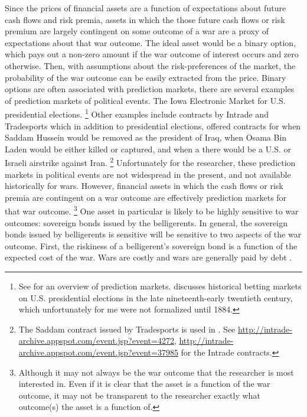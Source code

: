Since the prices of financial assets are a function of expectations about future cash flows and risk premia, assets in which the those future cash flows or risk premium are largely contingent on some outcome of a war are a proxy of expectations about that war outcome.
The ideal asset would be a binary option, which pays out a non-zero amount if the war outcome of interest occurs and zero otherwise.
Then, with assumptions about the risk-preferences of the market, the probability of the war outcome can be easily extracted from the price.
Binary options are often associated with prediction markets, there are several examples of prediction markets of political events. 
The Iowa Electronic Market for U.S. presidential elections.%
\footnote{
  See \textcite{WolfersZitzewitz2004} for an overview of prediction markets.
  \textcite{RhodeStrumpf2004a} discusses historical betting markets on U.S. presidential elections in the late nineteenth-early twentieth century, which unfortunately for me were not formalized until 1884.
}
Other examples include contracts by Intrade and Tradesports which in addition to presidential elections, offered contracts for when Saddam Hussein would be removed as the president of Iraq, when Osama Bin Laden would be either killed or captured, and when a there would be a U.S. or Israeli airstrike against Iran.%
\footnote{
  The Saddam contract issued by Tradesports is used in \textcite{LeighWolfersEtAl2003}.
  See \url{http://intrade-archive.appspot.com/event.jsp?event=4272}, \url{http://intrade-archive.appspot.com/event.jsp?event=37985} for the Intrade contracts.
}
Unfortunately for the researcher, these prediction markets in political events are not widespread in the present, and not available historically for wars.
However, financial assets in which the cash flows or risk premia are contingent on a war outcome are effectively prediction markets for that war outcome.%
\footnote{
  Although it may not always be the war outcome that the researcher is most interested in.
  Even if it is clear that the asset is a function of the war outcome, it may not be transparent to the researcher exactly what outcome(s) the asset is a function of.
}
One asset in particular is likely to be highly sensitive to war outcomes: sovereign bonds issued by the belligerents.
In general, the sovereign bonds issued by belligerents is sensitive will be sensitive to two aspects of the war outcome.
First, the riskiness of a belligerent's sovereign bond is a function of the expected cost of the war.
Wars are costly and wars are generally paid by debt \parencite{Slantchev2012a}.
